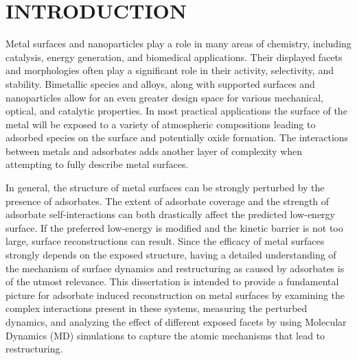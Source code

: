 %

\chapter{INTRODUCTION}
Metal surfaces and nanoparticles play a role in many areas of chemistry,
including catalysis\citep{}, energy generation\citep{}, and biomedical
applications.\citep{} Their displayed facets and morphologies often play a
significant role in their activity\citep{}, selectivity\citep{}, and
stability\citep{}. Bimetallic species and alloys\citep{}, along with supported
surfaces and nanoparticles\citep{} allow for an even greater design space for
various mechanical\citep{}, optical\citep{}, and catalytic properties.\citep{}
In most practical applications the surface of the metal will be exposed to a
variety of atmospheric compositions leading to adsorbed species on the surface
and potentially oxide formation. The interactions between metals and adsorbates
adds another layer of complexity when attempting to fully describe metal
surfaces.

In general, the structure of metal surfaces can be strongly perturbed by the
presence of adsorbates. The extent of adsorbate coverage and the strength of
adsorbate self-interactions can both drastically affect the predicted
low-energy surface. If the preferred low-energy is modified and the kinetic
barrier is not too large, surface reconstructions can result.  Since the
efficacy of metal surfaces strongly depends on the exposed structure, having a
detailed understanding of the mechanism of surface dynamics and restructuring
as caused by adsorbates is of the utmost relevance. This dissertation is
intended to provide a fundamental picture for adsorbate induced reconstruction
on metal surfaces by examining the complex interactions present in these
systems, measuring the perturbed dynamics, and analyzing the effect of
different exposed facets by using Molecular Dynamics (MD) simulations to
capture the atomic mechanisms that lead to restructuring.


